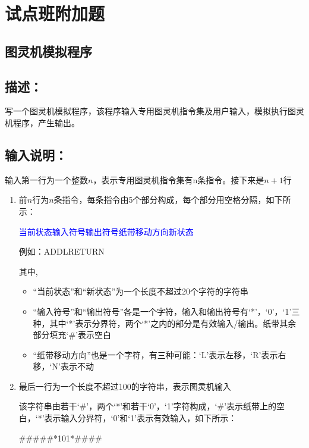 %
%
%
\chapter{试点班附加题}  

\section{图灵机模拟程序}

\section*{描述：}

写一个图灵机模拟程序，该程序输入专用图灵机指令集及用户输入，模拟执行图灵机程序，产生输出。

\section*{输入说明：}

输入第一行为一个整数$n$，表示专用图灵机指令集有n条指令。接下来是$n+1$行

\begin{enumerate}[1)]
	\item 前$n$行为$n$条指令，每条指令由5个部分构成，每个部分用空格分隔，如下所示：
	
	\textcolor{blue}{当前状态\textvisiblespace 输入符号\textvisiblespace 输出符号\textvisiblespace 纸带移动方向\textvisiblespace 新状态}
	
	例如：ADD\textvisiblespace L\textvisiblespace RETURN
	
	其中,
	\begin{itemize}
		\item ``当前状态''和``新状态''为一个长度不超过20个字符的字符串
		\item ``输入符号''和``输出符号''各是一个字符，输入和输出符号有`*'，`0'，`1'三种，其中`*'表示分界符，两个`*'之内的部分是有效输入/输出。纸带其余部分填充`\#'表示空白
		\item ``纸带移动方向''也是一个字符，有三种可能：`L'表示左移，`R'表示右移，`N'表示不动
	\end{itemize}
	
	\item 最后一行为一个长度不超过100的字符串，表示图灵机输入
	
	该字符串由若干`\#'，两个`*'和若干`0'，`1'字符构成，`\#'表示纸带上的空白，`*'表示输入分界符，`0'和`1'表示有效输入，如下所示：
	
	\#\#\#\#\#*101*\#\#\#\#
\end{enumerate}

